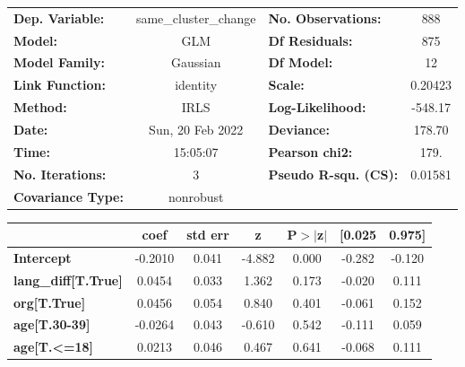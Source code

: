 \begin{center}
\begin{tabular}{lclc}
\toprule
\textbf{Dep. Variable:}       & same\_cluster\_change & \textbf{  No. Observations:  } &      888    \\
\textbf{Model:}               &          GLM          & \textbf{  Df Residuals:      } &      875    \\
\textbf{Model Family:}        &        Gaussian       & \textbf{  Df Model:          } &       12    \\
\textbf{Link Function:}       &        identity       & \textbf{  Scale:             } &   0.20423   \\
\textbf{Method:}              &          IRLS         & \textbf{  Log-Likelihood:    } &   -548.17   \\
\textbf{Date:}                &    Sun, 20 Feb 2022   & \textbf{  Deviance:          } &    178.70   \\
\textbf{Time:}                &        15:05:07       & \textbf{  Pearson chi2:      } &     179.    \\
\textbf{No. Iterations:}      &           3           & \textbf{  Pseudo R-squ. (CS):} &  0.01581    \\
\textbf{Covariance Type:}     &       nonrobust       & \textbf{                     } &             \\
\bottomrule
\end{tabular}
\begin{tabular}{lcccccc}
                              & \textbf{coef} & \textbf{std err} & \textbf{z} & \textbf{P$> |$z$|$} & \textbf{[0.025} & \textbf{0.975]}  \\
\midrule
\textbf{Intercept}            &      -0.2010  &        0.041     &    -4.882  &         0.000        &       -0.282    &       -0.120     \\
\textbf{lang\_diff[T.True]}   &       0.0454  &        0.033     &     1.362  &         0.173        &       -0.020    &        0.111     \\
\textbf{org[T.True]}          &       0.0456  &        0.054     &     0.840  &         0.401        &       -0.061    &        0.152     \\
\textbf{age[T.30-39]}         &      -0.0264  &        0.043     &    -0.610  &         0.542        &       -0.111    &        0.059     \\
\textbf{age[T.<=18]}          &       0.0213  &        0.046     &     0.467  &         0.641        &       -0.068    &        0.111     \\

\end{tabular}
\end{center}
